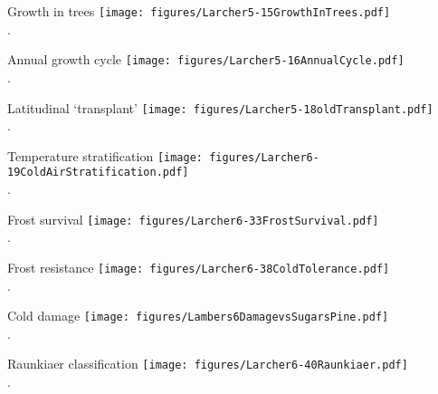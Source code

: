 \documentclass[10pt]{beamer}
\begin{document}
\begin{frame}{Growth in trees}
    \centering
    \texttt{[image: figures/Larcher5-15GrowthInTrees.pdf]}\\
    {\small \autocite[from][]{Larcher2003}.}
\end{frame}

\begin{frame}{Annual growth cycle}
    \centering
    \texttt{[image: figures/Larcher5-16AnnualCycle.pdf]}\\
    {\small \autocite[from][]{Larcher2003}.}
\end{frame}

\begin{frame}{Latitudinal `transplant'}
    \centering
    \texttt{[image: figures/Larcher5-18oldTransplant.pdf]}\\
    {\small \autocite[from][]{Larcher1995}.}
\end{frame}

\begin{frame}{Temperature stratification}
    \centering
    \texttt{[image: figures/Larcher6-19ColdAirStratification.pdf]}\\
    {\small \autocite[from][]{Larcher2003}.}
\end{frame}

\begin{frame}{Frost survival}
    \centering
    \texttt{[image: figures/Larcher6-33FrostSurvival.pdf]}\\
    {\small \autocite[from][]{Larcher2003}.}
\end{frame}

\begin{frame}{Frost resistance}
    \texttt{[image: figures/Larcher6-38ColdTolerance.pdf]}\\
    {\small \autocite[from][]{Larcher2003}.}
\end{frame}

\begin{frame}{Cold damage}
    \centering
    \texttt{[image: figures/Lambers6DamagevsSugarsPine.pdf]}\\
    {\small \autocite[from][]{LambersEtAl1998}.}
\end{frame}

\begin{frame}{Raunkiaer classification}
    \centering
    \texttt{[image: figures/Larcher6-40Raunkiaer.pdf]}\\
    {\small \autocite[from][]{Larcher2003}.}
\end{frame}
\end{document}
